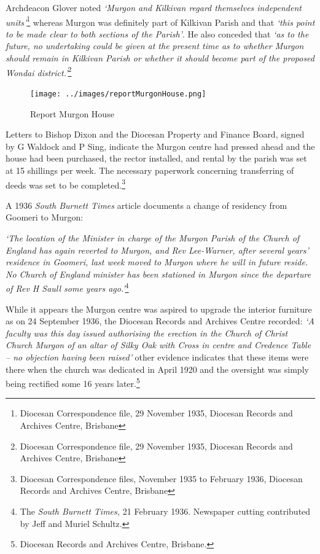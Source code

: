 Archdeacon Glover noted \emph{`Murgon and Kilkivan regard themselves independent units'}\footnote{Diocesan Correspondence file, 29 November 1935, Diocesan Records and Archives Centre, Brisbane} whereas Murgon was definitely part of Kilkivan Parish and that \emph{`this point to be made clear to both sections of the Parish'}. He also conceded that \emph{`as to the future, no undertaking could be given at the present time as to whether Murgon should remain in Kilkivan Parish or whether it should become part of the proposed Wondai district.'}\footnote{Diocesan Correspondence file, 29 November 1935, Diocesan Records and Archives Centre, Brisbane}








\begin{figure}
\begin{center}
\texttt{[image: ../images/reportMurgonHouse.png]}
\caption{Report Murgon House}
\end{center}
\end{figure}




Letters to Bishop Dixon and the Diocesan Property and Finance Board, signed by G Waldock and P Sing, indicate the Murgon centre had pressed ahead and the house had been purchased, the rector installed, and rental by the parish was set at 15 shillings per week. The necessary paperwork concerning transferring of deeds was set to be completed.\footnote{Diocesan Correspondence files, November 1935 to February 1936, Diocesan Records and Archives Centre, Brisbane}


A 1936 \emph{South Burnett Times} article documents a change of residency from Goomeri to Murgon:



\emph{`The location of the Minister in charge of the Murgon Parish of the Church of England has again reverted to Murgon, and Rev Lee-Warner, after several years' residence in Goomeri, last week moved to Murgon where he will in future reside. No Church of England minister has been stationed in Murgon since the departure of Rev H Saull some years ago.'}\footnote{The \emph{South Burnett Times,} 21 February 1936. Newspaper cutting contributed by Jeff and Muriel Schultz.}


\smallskip


While it appears the Murgon centre was aspired to upgrade the interior furniture as on 24 September 1936, the Diocesan Records and Archives Centre recorded: \emph{`A faculty was this day issued authorising the erection in the Church of Christ Church Murgon of an altar of Silky Oak with Cross in centre and Credence Table -- no objection having been raised'} other evidence indicates that these items were there when the church was dedicated in April 1920 and the oversight was simply being rectified some 16 years later.\footnote{Diocesan Records and Archives Centre, Brisbane.}


